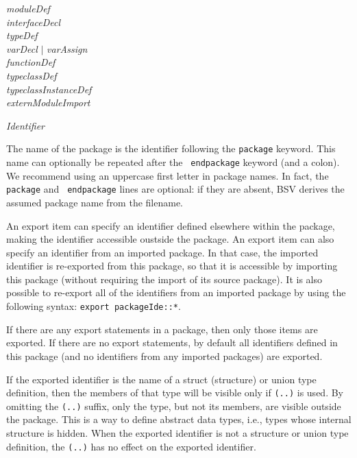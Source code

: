 \documentclass[twoside,letterpaper]{article}
\newcommand{\hm}{\hspace*{1em}}
\newcommand{\BSV}{BSV}
\newcommand{\te}[1]{\texttt{#1}}
\newcommand{\nterm}[1]{\emph{#1}}
\newcommand{\alt}{{$\mid$}}
\newcommand{\gram}[2]{    \hm\makebox[10em][l]{\it #1}\makebox[1.5em][l]{::=}    #2}
\newcommand{\gramalt}[1]{ \hm\makebox[10em][l]{      }\makebox[1.5em][l]{\alt}   #1}
\begin{document}
\gram{packageStmt}{ \nterm{moduleDef} } \\
\gramalt          { \nterm{interfaceDecl} } \\
\gramalt          { \nterm{typeDef} } \\
\gramalt          { \nterm{varDecl} {\alt} \nterm{varAssign} } \\
\gramalt          { \nterm{functionDef} } \\
\gramalt          { \nterm{typeclassDef} } \\
\gramalt          { \nterm{typeclassInstanceDef} } \\
\gramalt          { \nterm{externModuleImport} }

\gram{packageIde}{\nterm{Identifier}}

The name of the package is the identifier following the \texttt{package}
keyword.  This name can optionally be repeated after the {\tt
endpackage} keyword (and a colon).  We recommend using an uppercase
first letter in package names.  In fact, the \texttt{package} and {\tt
endpackage} lines are optional: if they are absent, {\BSV} derives the
assumed package name from the filename.

An export item can specify an identifier defined elsewhere within the
package,  making the identifier accessible oustside the package.
An export item can also specify 
an identifier from an imported package. In that case, the imported 
identifier is re-exported from this package, so that it is accessible
by importing this package (without requiring the import of its source 
package). It is also possible to re-export all of the identifiers 
from an imported package by using the following syntax: 
\texttt{export packageIde::*}.

 
If there are any export statements in a package, then only 
those items are exported. If there are no export statements, 
by default all identifiers defined in this package (and no identifiers 
from any imported packages) are exported. %

If the exported identifier is the name of a struct (structure) or
union type definition, then the members of that type will be visible
only if \texttt{(..)}  is used.  By omitting the \texttt{(..)} suffix, only
the type, but not its members, are visible outside the package.  This
is a way to define abstract data types, i.e., types whose internal
structure is hidden.  When the exported identifier is not a structure
or union type definition, the \te{(..)} has no effect on the exported
identifier. 
\end{document}
